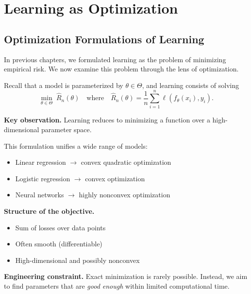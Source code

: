\chapter{Learning as Optimization}

\section{Optimization Formulations of Learning}

In previous chapters, we formulated learning as the problem of minimizing empirical risk. We now examine this problem through the lens of optimization.

\medskip

Recall that a model is parameterized by $\theta \in \Theta$, and learning consists of solving
\[
\min_{\theta \in \Theta} \; \hat{R}_n(\theta)
\quad \text{where} \quad
\hat{R}_n(\theta) = \frac{1}{n} \sum_{i=1}^n \ell(f_\theta(x_i), y_i).
\]

\medskip

\noindent
\textbf{Key observation.}  
Learning reduces to minimizing a function over a high-dimensional parameter space.

\medskip

This formulation unifies a wide range of models:
\begin{itemize}
    \item Linear regression $\rightarrow$ convex quadratic optimization
    \item Logistic regression $\rightarrow$ convex optimization
    \item Neural networks $\rightarrow$ highly nonconvex optimization
\end{itemize}

\medskip

\noindent
\textbf{Structure of the objective.}
\begin{itemize}
    \item Sum of losses over data points
    \item Often smooth (differentiable)
    \item High-dimensional and possibly nonconvex
\end{itemize}

\medskip

\noindent
\textbf{Engineering constraint.}  
Exact minimization is rarely possible. Instead, we aim to find parameters that are \emph{good enough} within limited computational time.

\medskip

